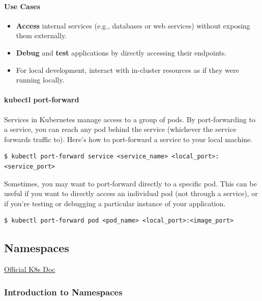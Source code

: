 \documentclass{article}
\newenvironment{codetemplate}[1][]{%
  \mybasecolorbox[#1]
  \itshape
}{%
  \endmybasecolorbox
}
\begin{document}
\paragraph{Use Cases}
\begin{itemize}
    \item \textbf{Access} internal services (e.g., databases or web services) without exposing them externally.
    \item \textbf{Debug} and \textbf{test} applications by directly accessing their endpoints.
    \item For local development, interact with in-cluster resources as if they were running locally.
\end{itemize}

\paragraph{kubectl port-forward}
Services in Kubernetes manage access to a group of pods. By port-forwarding to a service, you can reach any pod behind the service (whichever the service forwards traffic to). Here's how to port-forward a service to your local machine.

\begin{codetemplate}{}
\begin{verbatim}
$ kubectl port-forward service <service_name> <local_port>:<service_port>
\end{verbatim}
\end{codetemplate}

Sometimes, you may want to port-forward directly to a specific pod. This can be useful if you want to directly access an individual pod (not through a service), or if you're testing or debugging a particular instance of your application.
\begin{codetemplate}{}
\begin{verbatim}
$ kubectl port-forward pod <pod_name> <local_port>:<image_port>
\end{verbatim}
\end{codetemplate}

\newpage
\subsection{Namespaces}

\href{https://kubernetes.io/docs/concepts/overview/working-with-objects/namespaces/}{Official K8s Doc}

\subsubsection{Introduction to Namespaces}
\label{IntNames}
\end{document}
